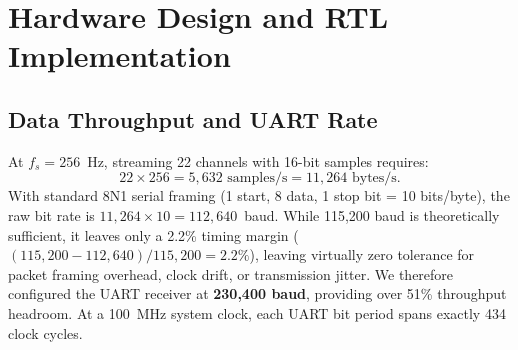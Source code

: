 \documentclass[10pt,twocolumn,letterpaper]{article}
\begin{document}
{\color{blue}
\section{Hardware Design and RTL Implementation}
\label{sec:rtl_design}

\subsection{Data Throughput and UART Rate}
At $f_s = 256$~Hz, streaming 22 channels with 16-bit samples requires:
\begin{equation}
22 \times 256 = 5{,}632 \text{ samples/s} = 11{,}264 \text{ bytes/s}.
\end{equation}
With standard 8N1 serial framing (1 start, 8 data, 1 stop bit = 10 bits/byte), the raw bit rate is $11{,}264 \times 10 = 112{,}640$~baud. While 115,200 baud is theoretically sufficient, it leaves only a 2.2\% timing margin ($(115{,}200 - 112{,}640)/115{,}200 = 2.2\%$), leaving virtually zero tolerance for packet framing overhead, clock drift, or transmission jitter. We therefore configured the UART receiver at \textbf{230,400 baud}, providing over 51\% throughput headroom. At a 100~MHz system clock, each UART bit period spans exactly 434 clock cycles.

}
\end{document}
